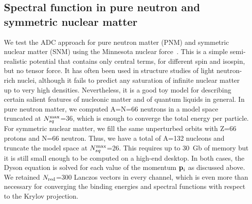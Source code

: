 


\subsection{Spectral function in pure neutron and symmetric nuclear matter}
\label{sec:scgf_comp_results}



We test the ADC approach for pure neutron matter (PNM) and symmetric nuclear matter (SNM) using the Minnesota nuclear force~\cite{ch11_minnesota}. This is a simple semi-realistic potential that contains only central terms, for different spin and isospin, but no tensor force. It has often been used in structure studies of light neutron-rich nuclei, although it  fails to  predict any saturation of infinite nuclear matter up to very high densities.  Nevertheless, it is a good toy model for describing certain salient features of nucleonic matter and of quantum liquids in general.
%
In pure neutron matter, we computed  A=N=66 neutrons in a model space truncated at $N_{sq}^{\rm max}$=36, which is enough to converge the total energy per particle. For symmetric nuclear matter, we fill the same unperturbed orbits with Z=66 protons and N=66 neutron. Thus, we have a total of A=132 nucleons and truncate the model space at $N_{sq}^{\rm max}$=26. This requires up to 30~Gb of memory but it 
is still small enough to be computed on a high-end desktop.  In both cases,  the Dyson equation is solved for each value of the momentum ${\bf p}_i$ as discussed above. We retained $N_{\rm red}$=300 Lanczos vectors in every channel, which is even more than necessary for converging the binding energies and spectral functions with respect to the Krylov projection. 


